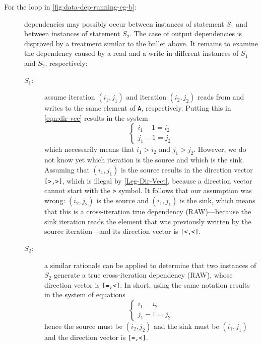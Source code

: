 \begin{description}
\item[For the loop in \cref{fig:data-dep-running-eg-b}:] dependencies
  may possibly occur between instances of statement $S_1$
  and between instances of statement $S_2$. The case of
  output dependencies is disproved by a treatment similar
  to the bullet above. It remains to examine the dependency
  caused by a read and a write in different instances of
  $S_1$ and $S_2$, respectively:
  \begin{description}
  \item[$S_1$:] assume iteration $(i_1,j_1)$ and iteration $(i_2,j_2)$
    reads from and writes to the same element of \texttt{A},
    respectively. Putting this in \cref{eqn:dir-vec} results in the
    system
    \[
      \begin{cases}i_1-1 = i_2\\j_1-1 = j_2\end{cases}
    \]
    which necessarily means that $i_1 > i_2$ and $j_1 > j_2$.
    However, we do not know yet which iteration is the source and
    which is the sink. Assuming that $(i_1, j_1)$ is the source
    results in the direction vector \texttt{[>,>]}, which is illegal
    by \cref{Leg-Dir-Vect}, because a direction vector cannot start
    with the \texttt{>} symbol. It follows that our assumption was
    wrong: $(i_2, j_2)$ is the source and $(i_1, j_1)$ is the sink,
    which means that this is a cross-iteration true dependency
    (RAW)---because the sink iteration reads the element that was
    previously written by the source iteration---and its direction
    vector is \texttt{[<,<]}.
  \item[$S_2$:] a similar rationale can be applied to
    determine that two instances of $S_2$ generate
    a true cross-iteration dependency (RAW), whose
    direction vector is \texttt{[=,<]}. In short, using the
    same notation results in the system of equations
    \[
      \begin{cases}i_1 = i_2\\j_1-1 = j_2\end{cases}
    \]
    hence the source must be $(i_2,j_2)$ and the sink must be
    $(i_1,j_1)$ and the direction vector is \texttt{[=,<]}.
  \end{description}


\end{description}
